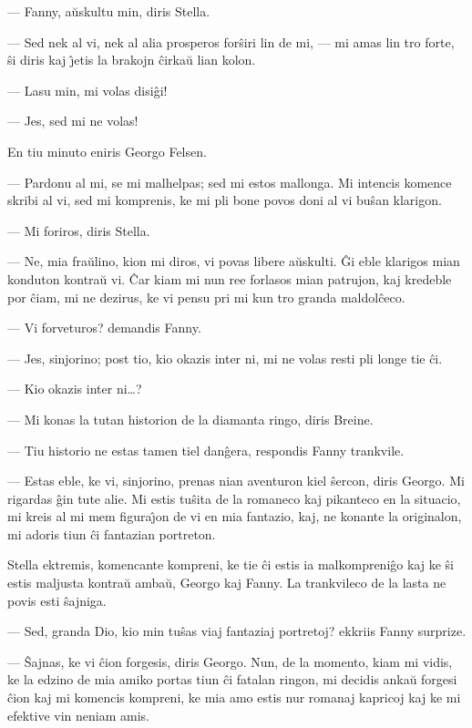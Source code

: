  --- Fanny, a\u uskultu min, diris Stella.

 --- Sed nek al vi, nek al alia prosperos for\^siri lin de mi, --- mi
amas lin tro forte, \^si diris kaj \^{\j}etis la brakojn \^cirka\u u
lian kolon.

 --- Lasu min, mi volas disi\^gi!

 --- Jes, sed mi ne volas!

   En tiu minuto eniris Georgo Felsen.

 --- Pardonu al mi, se mi malhelpas; sed mi estos mallonga. Mi intencis
komence skribi al vi, sed mi komprenis, ke mi pli bone povos doni al
vi bu\^san klarigon.

 --- Mi foriros, diris Stella.

 --- Ne, mia fra\u ulino, kion mi diros, vi povas libere a\u uskulti. \^Gi
eble klarigos mian konduton kontra\u u vi. \^Car kiam mi nun ree
forlasos mian patrujon, kaj kredeble por \^ciam, mi ne dezirus, ke
vi pensu pri mi kun tro granda maldol\^ceco.

 --- Vi forveturos? demandis Fanny.

 --- Jes, sinjorino; post tio, kio okazis inter ni, mi ne volas resti
pli longe tie \^ci.

 --- Kio okazis inter ni\dots ?

 --- Mi konas la tutan historion de la diamanta ringo, diris Breine.

 --- Tiu historio ne estas tamen tiel dan\^gera, respondis Fanny
trankvile.

 --- Estas eble, ke vi, sinjorino, prenas nian aventuron kiel \^sercon,
diris Georgo. Mi rigardas \^gin tute alie. Mi estis tu\^sita de la
romaneco kaj pikanteco en la situacio, mi kreis al mi mem
figura\^{\j}on de vi en mia fantazio, kaj, ne konante la originalon,
mi adoris tiun \^ci fantazian portreton.

   Stella ektremis, komencante kompreni, ke tie \^ci estis ia
malkompreni\^go kaj ke \^si estis maljusta kontra\u u amba\u u,
Georgo kaj Fanny. La trankvileco de la lasta ne povis esti
\^sajniga.

 --- Sed, granda Dio, kio min tu\^sas viaj fantaziaj portretoj? ekkriis
Fanny surprize.

 --- \^Sajnas, ke vi \^cion forgesis, diris Georgo. Nun, de la momento,
kiam mi vidis, ke la edzino de mia amiko portas tiun \^ci fatalan
ringon, mi decidis anka\u u forgesi \^cion kaj mi komencis kompreni,
ke mia amo estis nur romanaj kapricoj kaj ke mi efektive vin neniam
amis.

